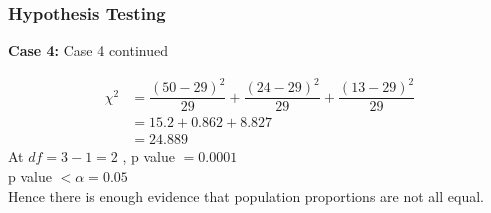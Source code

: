 \documentclass{beamer}
\begin{document}
\begin{frame}
  \frametitle{Hypothesis Testing}
  \begin{block}{\textbf{Case 4:} Case 4 continued}
   
    \begin{equation}
        \begin{aligned}
            \chi^{2} &= \dfrac{(50 - 29)^{2}}{29} + \dfrac{(24 -29)^{2}}{29} + \dfrac{(13 -29)^{2}}{29}\\
            &= 15.2 + 0.862 + 8.827\\
            &= 24.889 
        \end{aligned}
    \end{equation}
    At $df = 3 - 1 = 2 $ , p value $= 0.0001  $\\
    p value $< \alpha = 0.05$\\
    Hence there is enough evidence that population proportions are not all equal.


    \end{block}
\end{frame}

\end{document}

